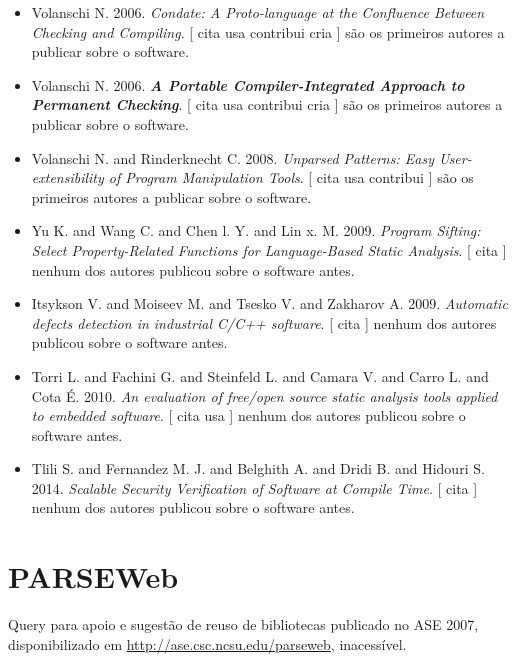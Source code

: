 \begin{itemize}
\item Volanschi N.
      2006.
        \textit{ Condate: A Proto-language at the Confluence Between Checking and Compiling}.
      [
          cita
          usa
          contribui
          cria
      ]
são os primeiros autores a publicar sobre o software.
\item Volanschi N.
      2006.
        \textbf{\textit{ A Portable Compiler-Integrated Approach to Permanent Checking}}.
      [
          cita
          usa
          contribui
          cria
      ]
são os primeiros autores a publicar sobre o software.
\item Volanschi N. and Rinderknecht C.
      2008.
        \textit{ Unparsed Patterns: Easy User-extensibility of Program Manipulation Tools}.
      [
          cita
          usa
          contribui
      ]
são os primeiros autores a publicar sobre o software.
\item Yu K. and Wang C. and Chen l. Y. and Lin x. M.
      2009.
        \textit{ Program Sifting: Select Property-Related Functions for Language-Based Static Analysis}.
      [
          cita
      ]
nenhum dos autores publicou sobre o software antes.
\item Itsykson V. and Moiseev M. and Tsesko V. and Zakharov A.
      2009.
        \textit{ Automatic defects detection in industrial C/C++ software}.
      [
          cita
      ]
nenhum dos autores publicou sobre o software antes.
\item Torri L. and Fachini G. and Steinfeld L. and Camara V. and Carro L. and Cota É.
      2010.
        \textit{ An evaluation of free/open source static analysis tools applied to embedded software}.
      [
          cita
          usa
      ]
nenhum dos autores publicou sobre o software antes.
\item Tlili S. and Fernandez M. J. and Belghith A. and Dridi B. and Hidouri S.
      2014.
        \textit{ Scalable Security Verification of Software at Compile Time}.
      [
          cita
      ]
nenhum dos autores publicou sobre o software antes.
\end{itemize}
\section{PARSEWeb}

Query para apoio e sugestão de reuso de bibliotecas
publicado no ASE 2007,
disponibilizado em \url{http://ase.csc.ncsu.edu/parseweb},
inacessível.

